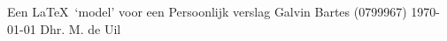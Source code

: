 \documentclass[11pt,a4paper,twoside,dutch]{report}%
\newif\ifpublic \newif\iftwocol %
\begin{document}
\titelblad                   %
  {Een \LaTeX\ `model' voor een Persoonlijk verslag} %
  {Galvin Bartes (0799967)} %
  {\TI}                      %
  {\today}                   %
  {Dhr. M. de Uil}           %
  {}                         %
\ifpublic
  {\footnotesize{}}
\else
  \tableofcontents         %
\fi
\ifpublic
  \iflanguage{dutch}{\def\bibname{\normalsize{Bronnen}}}
                    {\def\bibname{\normalsize{References}}}
  {\footnotesize{}}   %
\else
 
  \appendix
\fi
\end{document}
